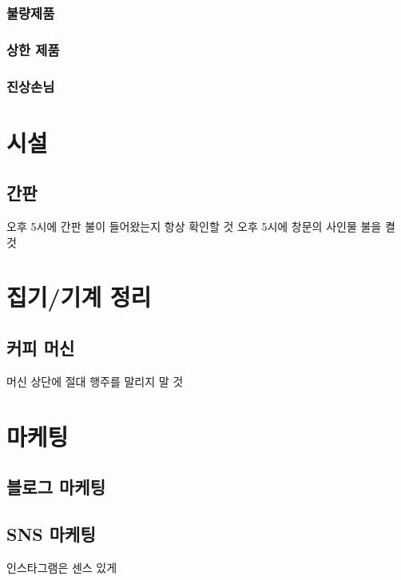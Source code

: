 \documentclass{myproc}
\begin{document}
\subsubsection{불량제품}

\subsubsection{상한 제품}

\subsubsection{진상손님}

\section{시설}
\subsection{간판}
\bit
\w 오후 5시에 간판 불이 들어왔는지 항상 확인할 것
\w 오후 5시에 창문의 사인물 불을 켤 것
\eit

\section{집기/기계 정리}
\subsection{커피 머신}
\bit
\w 머신 상단에 절대 행주를 말리지 말 것
\w 
\eit


\section{마케팅}
\subsection{블로그 마케팅}
\bit
\w 
\eit

\subsection{SNS 마케팅}
\bit
\w 인스타그램은 센스 있게
\eit


\end{document}
